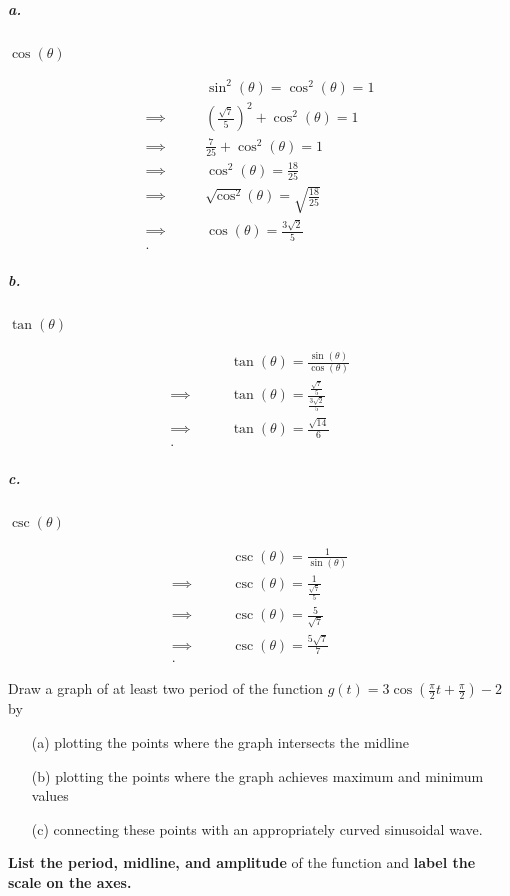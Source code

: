 \begin{solution}
  \subparagraph{a.} $\cos (\theta)$

    \begin{align*}
      &\qquad \sin^{2} (\theta) = \cos^{2} (\theta) = 1 \\
      \implies&\qquad \left(\frac{\sqrt{7}}{5}\right)^{2} + \cos^{2} (\theta) = 1 \\
      \implies&\qquad \frac{7}{25} + \cos^{2} (\theta) = 1 \\
      \implies&\qquad \cos^{2} (\theta) = \frac{18}{25} \\
      \implies&\qquad \sqrt{\cos^{2}} (\theta) = \sqrt{\frac{18}{25}} \\
      \implies&\qquad \cos (\theta) = \frac{3\sqrt{2}}{5} \\
    .\end{align*}

  \subparagraph{b.} $\tan (\theta)$

    \begin{align*}
      &\qquad\tan \left(\theta\right) = \frac{\sin \left(\theta\right)}{\cos \left(\theta\right)} \\
      \implies&\qquad \tan (\theta) = \frac{\frac{\sqrt{7}}{5}}{\frac{3\sqrt{2}}{5}} \\
      \implies&\qquad\tan (\theta) = \frac{\sqrt{14}}{6} \\
    .\end{align*}

  \subparagraph{c.} $\csc (\theta)$

    \begin{align*}
      &\qquad\csc \left(\theta\right) = \frac{1}{\sin \left(\theta\right)} \\
      \implies&\qquad \csc(\theta) = \frac{1}{\frac{\sqrt{7}}{5}} \\
      \implies&\qquad \csc (\theta) = \frac{5}{\sqrt{7}} \\
      \implies&\qquad \csc (\theta) = \frac{5\sqrt{7}}{7} \\
    .\end{align*}
\end{solution}

\newpage

\begin{problem}
  Draw a graph of at least two period of the function $g(t) = 3\cos
  (\frac{\pi}{2}t + \frac{\pi}{2}) - 2$ by

  \begin{itemize}
    \item[(a)] plotting the points where the graph intersects the midline
    \item[(b)] plotting the points where the graph achieves maximum and minimum
      values
    \item[(c)] connecting these points with an appropriately curved sinusoidal
      wave.
  \end{itemize}

  \textbf{List the period, midline, and amplitude} of the function and
  \textbf{label the scale on the axes.}
\end{problem}

